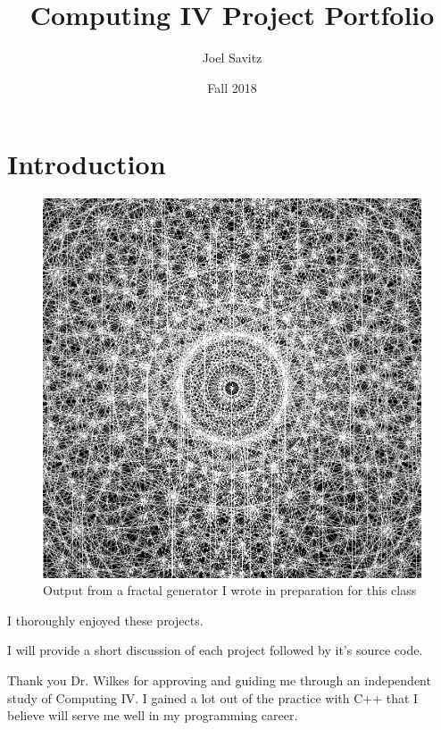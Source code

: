 \documentclass[12pt]{article}
\title{Computing IV Project Portfolio}
\date{Fall 2018}
\author{Joel Savitz}
\begin{document}
\maketitle
\thispagestyle{empty}

\newpage

\tableofcontents

\listoffigures

\newpage

\section{Introduction}

\begin{figure}

\includegraphics[scale=0.3]{../ps1_old/fractal_generator_example.png}
\centering

\caption{Output from a fractal generator I wrote in preparation for this class}

\end{figure}

I thoroughly enjoyed these projects. 

I will provide a short discussion of each project followed by it's source code.

Thank you Dr. Wilkes for approving and guiding me through an independent study of Computing IV. I gained a lot out of the practice with C++ that I believe will serve me well in my programming career.
\end{document}

